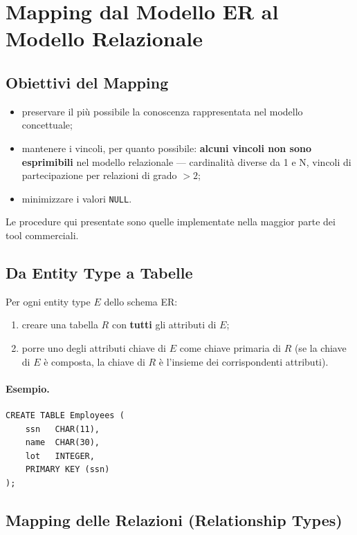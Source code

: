 \documentclass[12pt, a4paper]{article}
\begin{document}
\section{Mapping dal Modello ER al Modello Relazionale}

\subsection{Obiettivi del Mapping}
\begin{itemize}
    \item preservare il più possibile la conoscenza rappresentata nel modello concettuale;
    \item mantenere i vincoli, per quanto possibile: \textbf{alcuni vincoli non sono esprimibili} nel modello relazionale — cardinalità diverse da 1 e N, vincoli di partecipazione per relazioni di grado $>2$;
    \item minimizzare i valori \texttt{NULL}.
\end{itemize}
Le procedure qui presentate sono quelle implementate nella maggior parte dei tool commerciali.

\subsection{Da Entity Type a Tabelle}
Per ogni entity type $E$ dello schema ER:
\begin{enumerate}
    \item creare una tabella $R$ con \textbf{tutti} gli attributi di $E$;
    \item porre uno degli attributi chiave di $E$ come chiave primaria di $R$ (se la chiave di $E$ è composta, la chiave di $R$ è l'insieme dei corrispondenti attributi).
\end{enumerate}

\paragraph{Esempio.}
\begin{verbatim}
CREATE TABLE Employees (
    ssn   CHAR(11),
    name  CHAR(30),
    lot   INTEGER,
    PRIMARY KEY (ssn)
);
\end{verbatim}

\subsection{Mapping delle Relazioni (Relationship Types)}
\end{document}
